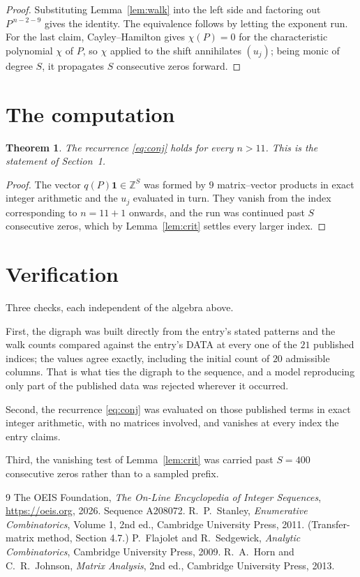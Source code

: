 \documentclass[11pt,a4paper]{article}
\theoremstyle{plain}
\newtheorem{theorem}{Theorem}
\theoremstyle{definition}
\begin{document}
\begin{proof}
Substituting Lemma~\ref{lem:walk} into the left side and factoring out
$P^{\,n-2-9}$ gives the identity. The equivalence follows by letting the exponent
run. For the last claim, Cayley--Hamilton gives $\chi(P)=0$ for the characteristic
polynomial $\chi$ of $P$, so $\chi$ applied to the shift annihilates $(u_j)$; being monic of
degree $S$, it propagates $S$ consecutive zeros forward.
\end{proof}

\section{The computation}

\begin{theorem}
The recurrence \eqref{eq:conj} holds for every $n>11$. This is the statement of
Section~1.
\end{theorem}

\begin{proof}
The vector $q(P)\mathbf{1}\in\mathbb{Z}^{S}$ was formed by $9$ matrix--vector
products in exact integer arithmetic and the $u_j$ evaluated in turn. They vanish from the
index corresponding to $n=11+1$ onwards, and the run was continued past $S$ consecutive
zeros, which by Lemma~\ref{lem:crit} settles every larger index.
\end{proof}

\section{Verification}

Three checks, each independent of the algebra above.

First, the digraph was built directly from the entry's stated patterns and the walk counts
compared against the entry's DATA at every one of the $21$ published indices; the
values agree exactly, including the initial count of $20$ admissible columns. That is
what ties the digraph to the sequence, and a model reproducing only part of the published
data was rejected wherever it occurred.

Second, the recurrence \eqref{eq:conj} was evaluated on those published terms in exact
integer arithmetic, with no matrices involved, and vanishes at every index the entry claims.

Third, the vanishing test of Lemma~\ref{lem:crit} was carried past $S=400$ consecutive
zeros rather than to a sampled prefix.

\begin{thebibliography}{9}
 The OEIS Foundation, \emph{The On-Line Encyclopedia of Integer
Sequences}, \url{https://oeis.org}, 2026. Sequence A208072.
 R.~P.~Stanley, \emph{Enumerative Combinatorics}, Volume 1, 2nd ed.,
Cambridge University Press, 2011. (Transfer-matrix method, Section 4.7.)
 P.~Flajolet and R.~Sedgewick, \emph{Analytic Combinatorics}, Cambridge
University Press, 2009.
 R.~A.~Horn and C.~R.~Johnson, \emph{Matrix Analysis}, 2nd ed., Cambridge
University Press, 2013.
\end{thebibliography}
\end{document}
